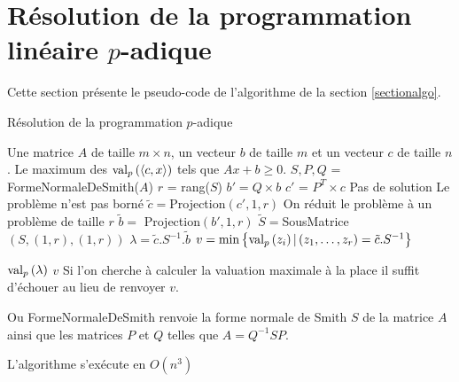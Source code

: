 \section{Résolution de la programmation linéaire \texorpdfstring{$p$}{p}-adique} 
\label{appendixalgo} 
Cette section présente le pseudo-code \iffalse ainsi qu'une implémentation en \sage \fi de l'algorithme de la section \ref{sectionalgo}.

 

\begin{algorithm}
\caption{Résolution de la programmation $p$-adique}
\begin{algorithmic}[0]
\Require Une matrice $A$ de taille $m \times n$, un vecteur $b$ de taille $m$ et un vecteur $c$ de taille $n$.
\Ensure Le maximum des $\text{val}_p\left(\left<c,x \right>\right)$ tels que $Ax+b\ge 0$. 
\State $S,P,Q$ = FormeNormaleDeSmith($A$)
\State $r$ = rang($S$)
\State $b' =Q \times b$
\State $c'$ = $P^T \times c$
\State \Failwith Pas de solution
\EndIf
\EndFor
{} 
\State \Failwith Le problème n'est pas borné
\EndIf
\EndFor
\State $\tilde{c} =$Projection$\left( c', 1, r \right) $ \Comment On réduit le problème à un problème de taille $r$ 
\State $\tilde{b} =$ Projection$\left(b', 1, r \right) $ 
\State $\tilde{S} = $SousMatrice$\left( S, (1,r),(1,r) \right) $
\State $\lambda = \tilde{c}. S^{-1}. \tilde{b} $
\State $v = \min \left\{\text{val}_p\left(z_{i}\right)| \left( z_1,\ldots,z_r \right) = \tilde{c}.S^{-1}  \right\}$

\Return $\text{val}_p\left( \lambda \right)$
\Else \Return $v$ \Comment Si l'on cherche à calculer la valuation maximale à la place il suffit d'échouer au lieu de renvoyer $v$.
\EndIf
\end{algorithmic}
\end{algorithm}

Ou FormeNormaleDeSmith renvoie la forme normale de Smith $S$ de la matrice $A$ ainsi que les matrices $P$ et $Q$ telles que $A = Q^{-1}SP$. 

L'algorithme s'exécute en $O\left( n^3 \right) $



%


